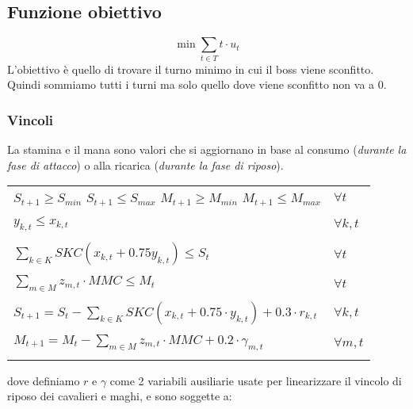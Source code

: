 \documentclass[12pt]{article}
\begin{document}
   \subsection{Funzione obiettivo}
    \begin{equation}
        \min \sum_{t \in T} t \cdot u_t
    \end{equation}
    L'obiettivo è quello di trovare il turno minimo in cui il boss viene sconfitto. Quindi sommiamo tutti i turni ma solo quello dove viene sconfitto non va a 0.\\

    \subsubsection{Vincoli}
La stamina e il mana sono valori che si aggiornano in base al consumo (\textit{durante la fase di attacco}) o alla ricarica (\textit{durante la fase di riposo}).\\
    \begin{tabular*}{\textwidth}{@{\extracolsep{\fill}} ll}
        \\
        $S_{t+1} \geq S_{min}$ \hspace{1cm} $S_{t+1} \leq S_{max}$ \hspace{1cm} $M_{t+1} \geq M_{min}$ \hspace{1cm} $M_{t+1} \leq M_{max}$  & $\forall t$ \\
        \\
        $y_{k,t} \leq x_{k,t}$ & $\forall k,t$ \\
        & \\
        $\sum_{k \in K} SKC(x_{k,t} + 0.75 y_{k,t}) \leq S_t$ & $\forall t$ \\
        & \\
        $\sum_{m \in M} z_{m,t} \cdot MMC \leq M_t$ & $\forall t$ \\
        & \\
       $S_{t+1} = S_t - \sum_{k \in K} SKC (x_{k,t} +0.75 \cdot y_{k,t}) + 0.3 \cdot r_{k,t}$ & $\forall k,t$ \\
       & \\
       $M_{t+1} = M_t - \sum_{m \in M} z_{m,t} \cdot MMC + 0.2 \cdot \gamma_{m,t}$ & $\forall m,t$ \\
         & \\
    \end{tabular*}
    dove definiamo $r$ e $\gamma$ come 2 variabili ausiliarie usate per linearizzare il vincolo di riposo dei cavalieri e maghi, e sono soggette a:\\
\end{document}
